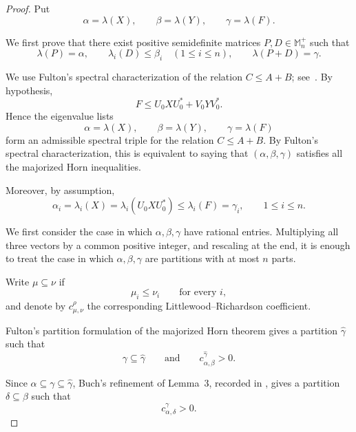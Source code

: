 \documentclass[10pt,a4paper]{amsart}
\numberwithin{equation}{section}
\newcommand{\Mnp}{\mathbb M_n^+}
\begin{document}
\begin{proof}

Put
\[
    \alpha=\lambda(X),\qquad
    \beta=\lambda(Y),\qquad
    \gamma=\lambda(F).
\]

We first prove that there exist positive semidefinite matrices
\(P,D\in\Mnp\) such that
\begin{equation}\label{eq:spectral-completion-revised}
    \lambda(P)=\alpha,\qquad
    \lambda_i(D)\leq\beta_i\quad(1\leq i\leq n),
    \qquad
    \lambda(P+D)=\gamma.
\end{equation}

We use Fulton's spectral characterization of the relation
\(C\leq A+B\); see~\cite[Theorem~1]{Fulton}.
By hypothesis,
\[
    F\leq U_0 X U_0^*+V_0 Y V_0^*.
\]
Hence the eigenvalue lists
\[
    \alpha=\lambda(X),\qquad
    \beta=\lambda(Y),\qquad
    \gamma=\lambda(F)
\]
form an admissible spectral triple for the relation \(C\leq A+B\).
By Fulton's spectral characterization, this is equivalent to saying
that \((\alpha,\beta,\gamma)\) satisfies all the majorized Horn
inequalities.



Moreover, by assumption,
\begin{equation}\label{eq:alpha-gamma}
    \alpha_i
    =\lambda_i(X)
    =\lambda_i(U_0 X U_0^*)
    \leq \lambda_i(F)
    =\gamma_i,
    \qquad 1\leq i\leq n.
\end{equation}

We first consider the case in which
\(\alpha,\beta,\gamma\) have rational entries. Multiplying all three
vectors by a common positive integer, and rescaling at the end, it is
enough to treat the case in which \(\alpha,\beta,\gamma\) are
partitions with at most \(n\) parts.

Write \(\mu\subseteq\nu\) if
\[
    \mu_i\leq\nu_i
    \qquad\text{for every }i,
\]
and denote by \(c_{\mu,\nu}^{\rho}\) the corresponding
Littlewood--Richardson coefficient.

Fulton's partition formulation of the majorized Horn theorem
\cite[Theorem~5 and the following remark]{Fulton} gives a partition
\(\widehat{\gamma}\) such that
\[
    \gamma\subseteq\widehat{\gamma}
    \qquad\text{and}\qquad
    c_{\alpha,\beta}^{\widehat{\gamma}}>0.
\]

Since $\alpha\subseteq\gamma\subseteq\widehat{\gamma}$,
Buch's refinement of Lemma~3, recorded in
\cite[footnote~2]{Fulton}, gives a partition
$\delta\subseteq\beta$ such that
\begin{equation}\label{eq:LR-refinement}
 c_{\alpha,\delta}^{\gamma}>0.
\end{equation}


\end{proof}
\end{document}

